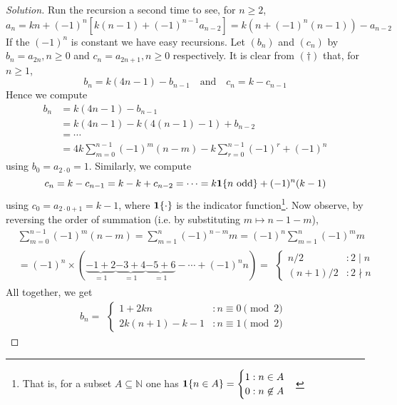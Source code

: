 \documentclass[11pt]{article}
\theoremstyle{definition}
\begin{document}
\begin{proof}[Solution]
    Run the recursion a second time to see, for $n \geq 2$, 
    \[a_n = kn + (-1)^n \left[k(n-1) + (-1)^{n-1}a_{n-2}\right] = k\left(n + (-1)^n(n-1)\right) - a_{n-2} \tag{$\dagger$}\]
    If the $(-1)^n$ is constant we have easy recursions. Let $(b_n)$ and $(c_n)$ by $b_n = a_{2n}, n \geq 0$ and 
    $c_n = a_{2n+1}, n \geq 0$ respectively. It is clear from $(\dagger)$ that, for $n \geq 1$,
    \[b_n = k(4n-1) - b_{n-1} \quad \text{and} \quad c_n = k - c_{n-1}\]
    Hence we compute
    \begin{align*}
        b_n &= k(4n-1) - b_{n-1} \\ 
        &= k(4n-1) - k(4(n-1)-1) + b_{n-2} \\ 
        &= \cdots \\ 
        &= 4k\sum_{m = 0}^{n-1}(-1)^m (n-m) - k\sum_{r = 0}^{n-1}(-1)^r + (-1)^n 
    \end{align*}
    using $b_0 = a_{2 \cdot 0} = 1$. Similarly, we compute
    \[c_n = k - c_{n-1} = k - k + c_{n-2} = \cdots = k{\bf 1}\{n \text{ odd}\} + (-1)^n (k - 1)\]
    using $c_0 = a_{2 \cdot 0 + 1} = k - 1$, where ${\bf 1}\{\cdot\}$ is the indicator function\footnote{That is, 
    for a subset $A \subseteq \mathbb{N}$ one has ${\bf 1}\{n \in A\} = \begin{cases}1 : n \in A \\ 0 : n \not\in A\end{cases}$}. 
    Now observe, by reversing the order of summation (i.e. by substituting $m \mapsto n-1-m$), 
    \begin{align*}
    &\sum_{m = 0}^{n-1} (-1)^m (n-m) = \sum_{m=1}^{n}(-1)^{n-m} m = (-1)^n \sum_{m=1}^n (-1)^m m \\
    &= (-1)^n \times \left(\underbrace{-1 + 2}_{=1} \underbrace{- 3 + 4}_{=1} \underbrace{- 5 + 6}_{=1}
    - \cdots + (-1)^{n}n\right) = \begin{aligned}\begin{cases} n/2 &: 2 \mid n \\ (n+1)/2 &: 2 \nmid n \end{cases}\end{aligned}
    \end{align*}
    All together, we get 
    \[b_n = \begin{aligned}\begin{cases}1 + 2kn &: n \equiv 0 \pmod 2 \\ 2k(n+1) - k - 1 &: n \equiv 1 \pmod 2\end{cases}\end{aligned}\]

\end{proof}
\end{document}

